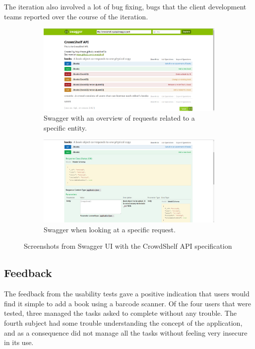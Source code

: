 The iteration also involved a lot of bug fixing, bugs that the client development teams reported over the course of the iteration.

\begin{figure}
\centering
\begin{subfigure}{\textwidth}
  \centering
  \includegraphics[width=\textwidth]{figs/v02/swagger2.png}
  \caption{Swagger with an overview of requests related to a specific entity.}
  \label{fig:swagger2}
\end{subfigure}%

\begin{subfigure}{\textwidth}
  \centering
  \includegraphics[width=\textwidth]{figs/v02/swagger3.png}
  \caption{Swagger when looking at a specific request.}
  \label{fig:swagger3}
\end{subfigure}
\caption{Screenshots from Swagger UI with the CrowdShelf \gls{API} specification}
\label{fig:02swagger-docs}
\end{figure}
\subsection{Feedback}

The feedback from the usability tests gave a positive indication that users would find it simple to add a book using a barcode scanner. Of the four users that were tested, three managed the tasks asked to complete without any trouble. The fourth subject had some trouble understanding the concept of the application, and as a consequence did not manage all the tasks without feeling very insecure in its use.

